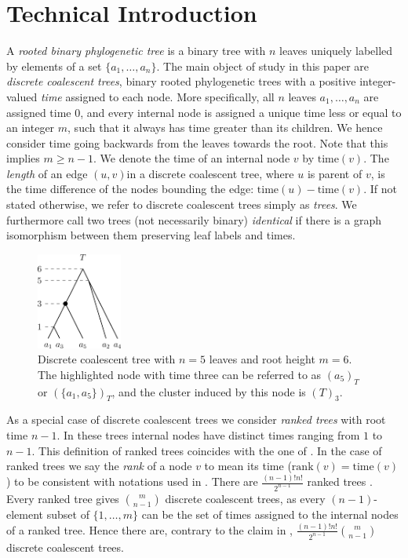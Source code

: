 \documentclass[11pt]{amsart}
\newcommand{\rank}{\mathrm{rank}}
\newcommand{\ntime}{\mathrm{time}}
\newcommand{\summary}[1]{} %
\begin{document}
\section{Technical Introduction}
\label{section:technical_introduction}

\summary{Introducing discrete coalescent trees and ranked trees}
A \emph{rooted binary phylogenetic tree} is a binary tree with $n$ leaves uniquely labelled by elements of a set $\{a_1, \ldots, a_n\}$.
The main object of study in this paper are \emph{discrete coalescent trees}, binary rooted phylogenetic trees with a positive integer-valued \emph{time} assigned to each node.
More specifically, all $n$ leaves $a_1, \ldots, a_n$ are assigned time $0$, and every internal node is assigned a unique time less or equal to an integer $m$, such that it always has time greater than its children.
We hence consider time going backwards from the leaves towards the root.
Note that this implies $m \geq n-1$.
We denote the time of an internal node $v$ by $\ntime(v)$.
The \emph{length} of an edge $(u,v)$in a discrete coalescent tree, where $u$ is parent of $v$, is the time difference of the nodes bounding the edge: $\ntime(u) - \ntime(v)$.
If not stated otherwise, we refer to discrete coalescent trees simply as \emph{trees}.
We furthermore call two trees (not necessarily binary) \emph{identical} if there is a graph isomorphism between them preserving leaf labels and times.

\begin{figure}[ht]
	\includegraphics[width=0.25\textwidth]{dtt_tree.eps}
	\caption{Discrete coalescent tree with $n = 5$ leaves and root height $m = 6$.
	The highlighted node with time three can be referred to as $(a_5)_T$ or $(\{a_1,a_5\})_T$, and the cluster induced by this node is $(T)_3$.}
	\label{fig:dtt_tree}
\end{figure}

As a special case of discrete coalescent trees we consider \emph{ranked trees} with root time $n-1$.
In these trees internal nodes have distinct times ranging from $1$ to $n-1$.
This definition of ranked trees coincides with the one of \textcite{Collienne2021}.
In the case of ranked trees we say the \emph{rank} of a node $v$ to mean its time ($\rank(v) = \ntime(v)$) to be consistent with notations used in \autocite{Collienne2021}.
There are $\frac{(n-1)!n!}{2^{n-1}}$ ranked trees \autocite{Semple2003-nj}.
Every ranked tree gives ${m \choose n-1}$ discrete coalescent trees, as every $(n-1)$-element subset of $\{1, \ldots, m\}$ can be the set of times assigned to the internal nodes of a ranked tree.
Hence there are, contrary to the claim in \autocite{Gavryushkin2018-ol}, $\frac{(n-1)!n!}{2^{n-1}} {m \choose n-1}$ discrete coalescent trees.
\end{document}
